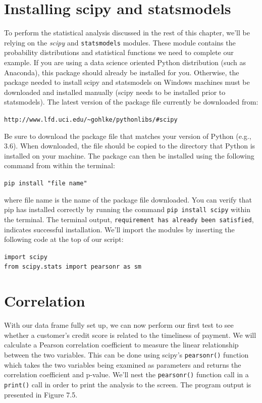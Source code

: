 \documentclass{book}
\begin{document}
\section{Installing scipy and statsmodels}

To perform the statistical analysis discussed in the rest of this chapter, we'll be relying on the \textit{scipy} and \texttt{statsmodels} modules. These module contains the probability distributions and statistical functions we need to complete our example. If you are using a data science oriented Python distribution (such as Anaconda), this package should already be installed for you. Otherwise, the package needed to install scipy and statsmodels on Windows machines must be downloaded and installed manually (scipy needs to be installed prior to statsmodels). The latest version of the package file currently be downloaded from:

\texttt{http://www.lfd.uci.edu/\textasciitilde gohlke/pythonlibs/\#scipy}

Be sure to download the package file that matches your version of Python (e.g., 3.6). When downloaded, the file should be copied to the directory that Python is installed on your machine. The package can then be installed using the following command from within the terminal: 

\texttt{pip install "file name"}

where file name is the name of the package file downloaded. You can verify that pip has installed correctly by running the command \texttt{pip install scipy} within the terminal. The terminal output, \texttt{requirement has already been satisfied}, indicates successful installation. We'll import the modules by inserting the following code at the top of our script:

\texttt{import scipy\\from scipy.stats import pearsonr\ as sm}

\section{Correlation}

With our data frame fully set up, we can now perform our first test to see whether a customer's credit score is related to the timeliness of payment. We will calculate a Pearson correlation coefficient to measure the linear relationship between the two variables. This can be done using scipy's \texttt{pearsonr()} function which takes the two variables being examined as parameters and returns the correlation coefficient and p-value. We'll nest the \texttt{pearsonr()} function call in a \texttt{print()} call in order to print the analysis to the screen. The program output is presented in Figure 7.5.
\end{document}
